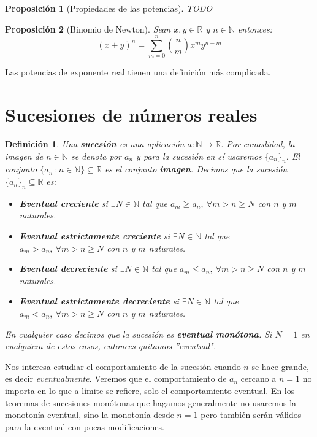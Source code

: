 \documentclass{article}
\newtheorem{prop}{Proposición}
\newtheorem{define}{Definición}
\begin{document}
\begin{prop}[Propiedades de las potencias]
TODO

\end{prop}

\begin{prop}[Binomio de Newton]
Sean $x,y \in \mathbb{R}$ y $n \in \mathbb{N}$ entonces:
\begin{equation}
(x + y)^n = \sum_{m=0}^{n} {n \choose m} x^m y^{n-m}
\end{equation}
\end{prop}

Las potencias de exponente real tienen una definición más complicada.










\newpage
\section{Sucesiones de números reales}

\begin{define}
	Una \textbf{sucesión} es una aplicación $a: \mathbb{N} \rightarrow \mathbb{R}$. Por comodidad, la imagen de $n \in \mathbb{N}$ se denota por $a_n$ y para la sucesión en sí usaremos $\{a_n\}_n$. El conjunto $\{a_n\ : n \in \mathbb{N}\} \subseteq \mathbb{R}$ es el conjunto \textbf{imagen}. Decimos que la sucesión
	$\{a_n\}_n \subseteq \mathbb{R}$ es:
	\begin{itemize}
		\item
		\textbf{Eventual creciente} si $\exists N \in \mathbb{N}$ tal que $a_m \geq a_n,\ \forall m>n\geq N$ con $n$ y $m$ naturales.
		\item
		\textbf{Eventual estrictamente creciente} si $\exists N \in \mathbb{N}$ tal que $a_m > a_n,\ \forall m>n\geq N$ con $n$ y $m$ naturales.
		\item
		\textbf{Eventual decreciente} si $\exists N \in \mathbb{N}$ tal que $a_m \leq a_n,\ \forall m>n\geq N$ con $n$ y $m$ naturales.
		\item
		\textbf{Eventual estrictamente decreciente} si $\exists N \in \mathbb{N}$ tal que $a_m < a_n,\ \forall m>n\geq N$ con $n$ y $m$ naturales.
	\end{itemize}
	En cualquier caso decimos que la sucesión es \textbf{eventual monótona}. Si $N = 1$ en cualquiera de estos casos, entonces quitamos ''eventual".
\end{define}
Nos interesa estudiar el comportamiento de la sucesión cuando $n$ se hace grande, es decir \textit{eventualmente}. Veremos que el comportamiento de $a_n$ cercano a $n = 1$ no importa
en lo que a límite se refiere, solo el comportamiento eventual. En los teoremas de sucesiones monótonas que hagamos generalmente no usaremos la monotonía eventual, sino la monotonía desde $n = 1$ pero también serán válidos para la eventual con pocas modificaciones.
\end{document}
